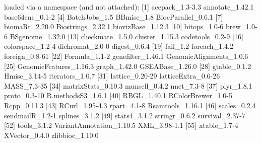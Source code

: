 \documentclass[11pt]{article}
\begin{document}
\begin{Schunk}
\begin{Soutput}
loaded via a namespace (and not attached):
 [1] acepack_1.3-3.3          annotate_1.42.1          base64enc_0.1-2         
 [4] BatchJobs_1.5            BBmisc_1.8               BiocParallel_0.6.1      
 [7] biomaRt_2.20.0           Biostrings_2.32.1        biovizBase_1.12.3       
[10] bitops_1.0-6             brew_1.0-6               BSgenome_1.32.0         
[13] checkmate_1.5.0          cluster_1.15.3           codetools_0.2-9         
[16] colorspace_1.2-4         dichromat_2.0-0          digest_0.6.4            
[19] fail_1.2                 foreach_1.4.2            foreign_0.8-61          
[22] Formula_1.1-2            genefilter_1.46.1        GenomicAlignments_1.0.6 
[25] GenomicFeatures_1.16.3   graph_1.42.0             GSEABase_1.26.0         
[28] gtable_0.1.2             Hmisc_3.14-5             iterators_1.0.7         
[31] lattice_0.20-29          latticeExtra_0.6-26      MASS_7.3-35             
[34] matrixStats_0.10.3       munsell_0.4.2            nnet_7.3-8              
[37] plyr_1.8.1               proto_0.3-10             R.methodsS3_1.6.1       
[40] RBGL_1.40.1              RColorBrewer_1.0-5       Rcpp_0.11.3             
[43] RCurl_1.95-4.3           rpart_4.1-8              Rsamtools_1.16.1        
[46] scales_0.2.4             sendmailR_1.2-1          splines_3.1.2           
[49] stats4_3.1.2             stringr_0.6.2            survival_2.37-7         
[52] tools_3.1.2              VariantAnnotation_1.10.5 XML_3.98-1.1            
[55] xtable_1.7-4             XVector_0.4.0            zlibbioc_1.10.0         
\end{Soutput}
\end{Schunk}

\newpage

\vspace{2cm}
\end{document}

